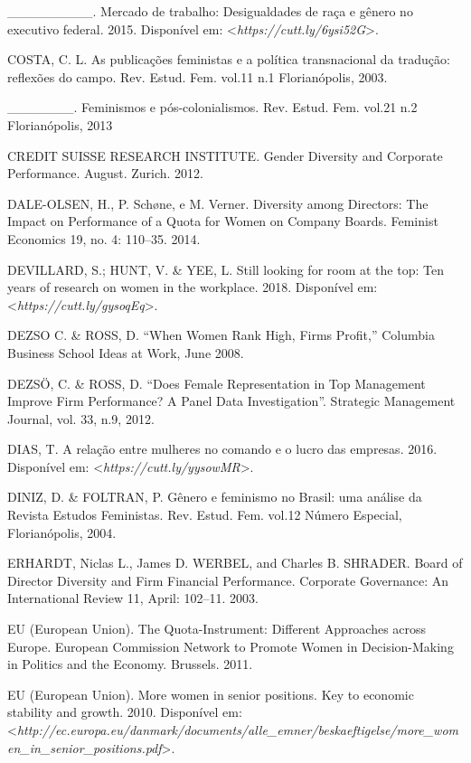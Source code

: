 \begin{Parskip}
\_\_\_\_\_\_\_\_\_. Mercado de trabalho: Desigualdades de raça e gênero
no executivo federal. 2015.
Disponível em: \textless{}\emph{https://cutt.ly/6ysi52G}\textgreater{}.

COSTA, C. L. As publicações feministas e a política transnacional da
tradução: reflexões do campo. Rev. Estud. Fem. vol.11 n.1 Florianópolis,
2003.

\_\_\_\_\_\_\_. Feminismos e pós-colonialismos. Rev. Estud. Fem. vol.21
n.2 Florianópolis, 2013

CREDIT SUISSE RESEARCH INSTITUTE. Gender Diversity and Corporate
Performance. August. Zurich. 2012.

DALE-OLSEN, H., P. Schøne, e M. Verner. Diversity among Directors: The
Impact on Performance of a Quota for Women on Company Boards. Feminist
Economics 19, no. 4: 110--35. 2014.

DEVILLARD, S.; HUNT, V. \& YEE, L. Still looking for room at the top:
Ten years of research on women in the workplace. 2018.
Disponível em: \textless{}\emph{https://cutt.ly/gysoqEq}\textgreater{}.

DEZSO C. \& ROSS, D. ``When Women Rank High, Firms Profit,'' Columbia
Business School Ideas at Work, June 2008.

DEZSÖ, C. \& ROSS, D. ``Does Female Representation in Top Management
Improve Firm Performance? A Panel Data Investigation''. Strategic
Management Journal, vol. 33, n.9, 2012.

DIAS, T. A relação entre mulheres no comando e o lucro das empresas.
2016.
Disponível em: \textless{}\emph{https://cutt.ly/yysowMR}\textgreater{}.

DINIZ, D. \& FOLTRAN, P. Gênero e feminismo no Brasil: uma análise da
Revista Estudos Feministas. Rev. Estud. Fem. vol.12 Número Especial,
Florianópolis, 2004.

ERHARDT, Niclas L., James D. WERBEL, and Charles B. SHRADER. Board of
Director Diversity and Firm Financial Performance. Corporate Governance:
An International Review 11, April: 102--11. 2003.

EU (European Union). The Quota-Instrument: Different Approaches across
Europe. European Commission Network to Promote Women in Decision-Making
in Politics and the Economy. Brussels. 2011.

EU (European Union). More women in senior positions. Key to economic
stability and growth. 2010.
Disponível em: \textless{}\emph{http://ec.europa.eu/danmark/documents/alle\_emner/beskaeftigelse/more\_women\_in\_senior\_positions.pdf}\textgreater{}.


\end{Parskip}
